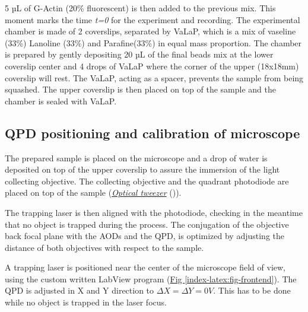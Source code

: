 \documentclass[A4paperpaper,11pt,english]{sphinxmanual}
\begin{document}
5 µL of G-Actin (20\% fluorescent) is then added to the previous mix. This
moment marks the time \emph{t=0} for the experiment and recording. The experimental chamber is
made of 2 coverslips, separated by VaLaP, which is a mix of vaseline (33\%)
Lanoline (33\%) and Parafine(33\%) in equal mass proportion. The chamber is prepared by gently depositing 20 µL of
the final beads mix at the lower coverslip center and 4 drops of VaLaP
where the corner of the upper (18x18mm) coverslip
will rest. The VaLaP, acting as a spacer, prevents the sample from being squashed.  The
upper coverslip is then placed on top of the sample and the chamber is sealed
with VaLaP.


\subsection{QPD positioning and calibration of microscope}
\label{index-latex:laser-calibration}\label{index-latex:qpd-positioning-and-calibration-of-microscope}
The prepared sample is placed on the microscope and a drop of water is
deposited on top of the upper coverslip to assure  the immersion of the light
collecting objective. The collecting objective and the quadrant photodiode are
placed on top of the sample ({\hyperref[index-latex:optical-tweezer]{\emph{Optical tweezer}}} ()).

The trapping laser is then aligned with the photodiode, checking in the meantime that no
object is trapped during the process. The conjugation of the objective back focal plane
with the AODs and the QPD, is optimized by adjusting the
distance of both objectives with respect to the sample.

A trapping laser is positioned near the center of the microscope field of view,
using the custom written LabView program (\hyperref[index-latex:fig-frontend]{Fig  \ref*{index-latex:fig-frontend}}). The QPD is adjusted in X and Y direction to
\(\Delta X  = \Delta Y = 0V\). This has to be  done while no object is trapped in
the  laser focus.
\end{document}
